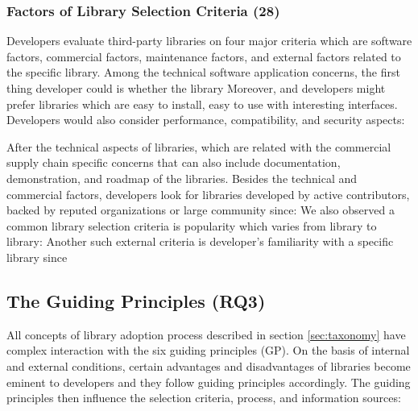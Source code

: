 \subsubsection{Factors of Library Selection Criteria (28)}
Developers evaluate third-party libraries on four major criteria which are software factors, commercial factors, maintenance factors, and external factors related to the specific library. Among the technical software application concerns, the first thing developer could is whether the library  Moreover,  and developers might prefer libraries which are easy to install, easy to use with interesting interfaces. Developers would also consider performance, compatibility, and security aspects: 

After the technical aspects of libraries,  which are related with the commercial supply chain specific concerns that can also include documentation, demonstration, and roadmap of the libraries. Besides the technical and commercial factors, developers look for libraries developed by active contributors, backed by reputed organizations or large community since:  We also observed a common library selection criteria is popularity which varies from library to library:  Another such external criteria is developer's familiarity with a specific library since  


\subsection{The Guiding Principles (RQ3)}
\label{sec:gp}

All concepts of library adoption process described in section \ref{sec:taxonomy} have complex interaction with the six guiding principles (GP). On the basis of internal and external conditions, certain advantages and disadvantages of libraries become eminent to developers and they follow guiding principles accordingly. The guiding principles then influence the selection criteria, process, and information sources:  

